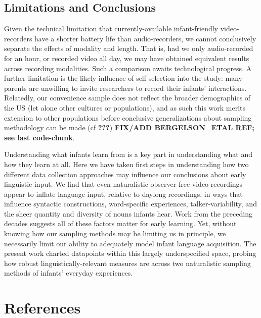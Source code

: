 \documentclass[floatsintext,man]{apa6}
\theoremstyle{definition}
\theoremstyle{definition}
\theoremstyle{definition}
\theoremstyle{remark}
\begin{document}
\subsection{Limitations and
Conclusions}\label{limitations-and-conclusions}

Given the technical limitation that currently-available infant-friendly
video-recorders have a shorter battery life than audio-recorders, we
cannot conclusively separate the effects of modality and length. That
is, had we only audio-recorded for an hour, or recorded video all day,
we may have obtained equivalent results across recording modalities.
Such a comparison awaits technological progress. A further limitation is
the likely influence of self-selection into the study: many parents are
unwilling to invite researchers to record their infants' interactions.
Relatedly, our convenience sample does not reflect the broader
demographics of the US (let alone other cultures or populations), and as
such this work merits extension to other populations before conclusive
generalizations about sampling methodology can be made (cf
{\textbf{???}}) \textbf{FIX/ADD BERGELSON\_ETAL REF; see last
code-chunk}.

Understanding what infants learn from is a key part in understanding
what and how they learn at all. Here we have taken first steps in
understanding how two different data collection approaches may influence
our conclusions about early linguistic input. We find that even
naturalistic observer-free video-recordings appear to inflate language
input, relative to daylong recordings, in ways that influence syntactic
constructions, word-specific experiences, talker-variability, and the
sheer quantity and diversity of nouns infants hear. Work from the
preceding decades suggests all of these factors matter for early
learning. Yet, without knowing how our sampling methods may be limiting
us in principle, we necessarily limit our ability to adequately model
infant language acquisition. The present work charted datapoints within
this largely underspecified space, probing how robust
linguistically-relevant measures are across two naturalistic sampling
methods of infants' everyday experiences.

\newpage

\section{References}\label{references}

\setlength{\parindent}{-0.5in} \setlength{\leftskip}{0.5in}
\end{document}
